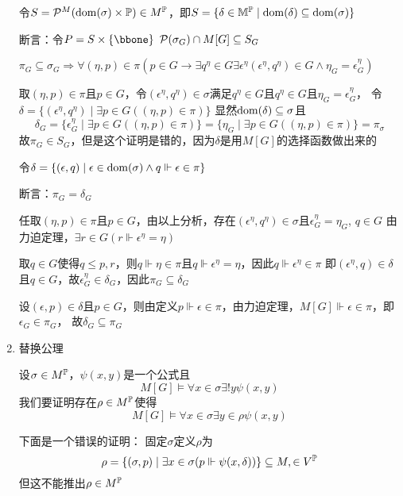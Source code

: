 \documentclass[11pt]{article}
\begin{document}
\begin{enumerate}
令\(S=\calp^M(\dom(\sigma)\times\P)\in M^{\P}\)，即\(S=\{\delta\in\M^{\P}\mid\dom(\delta)\subseteq\dom(\sigma)\}\)

断言：令\(P=S\times\{\bbone\}\) \(\calp(\sigma_G)\cap M[G]\subseteq S_G\)

\(\pi_G\subseteq\sigma_G\Rightarrow\forall(\eta,p)\in\pi(p\in G\to\exists q^\eta\in G\exists\epsilon^\eta(\epsilon^\eta,q^\eta)\in G\wedge\eta_G=\epsilon_G^\eta)\)

取\((\eta,p)\in \pi\)且\(p\in G\)，令\((\epsilon^\eta,q^\eta)\in\sigma\)满足\(q^\eta\in G\)且\(q^\eta\in G\)且\(\eta_G=\epsilon_G^\eta\)，
令\(\delta=\{(\epsilon^\eta,q^\eta)\mid\exists p\in G((\eta,p)\in \pi)\}\)
显然\(\dom(\delta)\subseteq\sigma\)且
\begin{equation*}
\delta_G=\{\epsilon_G^\eta\mid\exists p\in G((\eta,p)\in\pi)\}=\{\eta_G\mid\exists p\in G((\eta,p)\in\pi)\}=\pi_\sigma
\end{equation*}
故\(\pi_G\in S_G\)，但是这个证明是错的，因为\(\delta\)是用\(M[G]\)的选择函数做出来的

令\(\delta=\{(\epsilon,q)\mid\epsilon\in\dom(\sigma)\wedge q\Vdash\epsilon\in\pi\}\)

断言：\(\pi_G=\delta_G\)

任取\((\eta,p)\in\pi\)且\(p\in G\)，由以上分析，存在\((\epsilon^\eta,q^\eta)\in\sigma\)且\(\epsilon_G^\eta=\eta_G\), \(q\in G\)
由力迫定理，\(\exists r\in G(r\Vdash\epsilon^\eta=\eta)\)

取\(q\in G\)使得\(q\le p,r\)，则\(q\Vdash\eta\in\pi\)且\(q\Vdash\epsilon^\eta=\eta\)，因此\(q\Vdash\epsilon^\eta\in\pi\)
即\((\epsilon^\eta,q)\in\delta\)且\(q\in G\)，故\(\epsilon^\eta_G\in\delta_G\)，因此\(\pi_G\subseteq\delta_G\)

设\((\epsilon,p)\in\delta\)且\(p\in G\)，则由定义\(p\Vdash\epsilon\in\pi\)，由力迫定理，\(M[G]\Vdash\epsilon\in\pi\)，即\(\epsilon_G\in\pi_G\)，
故\(\delta_G\subseteq\pi_G\)
\item 替换公理

设\(\sigma\in M^{\P}\)，\(\psi(x,y)\)是一个公式且
\begin{equation*}
M[G]\vDash\forall x\in\sigma\exists!y\psi(x,y)
\end{equation*}
我们要证明存在\(\rho\in M^{\P}\)使得
\begin{equation*}
M[G]\vDash\forall x\in\sigma\exists y\in\rho\psi(x,y)
\end{equation*}

下面是一个错误的证明：
固定\(\sigma\)定义\(\rho\)为
\begin{equation*}
\rho=\{(\sigma,p)\mid\exists x\in\sigma(p\Vdash\psi(x,\delta))\}\subseteq M,\in V^{\P}
\end{equation*}
但这不能推出\(\rho\in M^{\P}\)


\end{enumerate}
\end{document}
